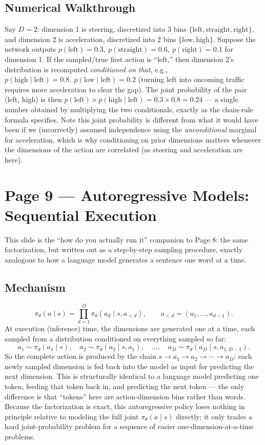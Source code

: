 \documentclass[11pt]{article}
\begin{document}
\subsection*{Numerical Walkthrough}

Say $D=2$: dimension 1 is steering, discretized into 3 bins $\{\text{left}, \text{straight}, \text{right}\}$, and dimension 2 is acceleration, discretized into 2 bins $\{\text{low}, \text{high}\}$. Suppose the network outputs $p(\text{left})=0.3,\ p(\text{straight})=0.6,\ p(\text{right})=0.1$ for dimension 1. If the sampled/true first action is ``left,'' then dimension 2's distribution is recomputed \emph{conditioned on that}, e.g., $p(\text{high} \mid \text{left}) = 0.8,\ p(\text{low}\mid\text{left}) = 0.2$ (turning left into oncoming traffic requires more acceleration to clear the gap). The joint probability of the pair (left, high) is then $p(\text{left})\times p(\text{high}\mid\text{left}) = 0.3 \times 0.8 = 0.24$ --- a single number obtained by multiplying the two conditionals, exactly as the chain-rule formula specifies. Note this joint probability is different from what it would have been if we (incorrectly) assumed independence using the \emph{unconditional} marginal for acceleration, which is why conditioning on prior dimensions matters whenever the dimensions of the action are correlated (as steering and acceleration are here).

\section*{Page 9 --- Autoregressive Models: Sequential Execution}

This slide is the ``how do you actually run it'' companion to Page 8: the same factorization, but written out as a step-by-step sampling procedure, exactly analogous to how a language model generates a sentence one word at a time.

\subsection*{Mechanism}

\[
\pi_\theta(a \mid s) = \prod_{d=1}^{D} \pi_\theta(a_d \mid s, a_{<d}), \qquad a_{<d} = (a_1,\dots,a_{d-1}).
\]
At execution (inference) time, the dimensions are generated one at a time, each sampled from a distribution conditioned on everything sampled so far:
\[
a_1 \sim \pi_\theta(a_1 \mid s), \quad a_2 \sim \pi_\theta(a_2 \mid s, a_1), \quad \dots, \quad a_D \sim \pi_\theta(a_D \mid s, a_{1:D-1}).
\]
So the complete action is produced by the chain $s \to a_1 \to a_2 \to \cdots \to a_D$: each newly sampled dimension is fed back into the model as input for predicting the next dimension. This is structurally identical to a language model predicting one token, feeding that token back in, and predicting the next token --- the only difference is that ``tokens'' here are action-dimension bins rather than words. Because the factorization is exact, this autoregressive policy loses nothing in principle relative to modeling the full joint $\pi_\theta(a\mid s)$ directly; it only trades a hard joint-probability problem for a sequence of easier one-dimension-at-a-time problems.
\end{document}
